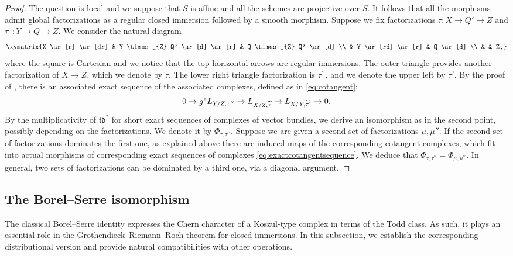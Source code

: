 \documentclass[11pt]{article}
\theoremstyle{plain}
\theoremstyle{definition}
\newcommand{\tdfrak}{\mathfrak {td}}
\begin{document}
\begin{proof}
The question is local and we suppose that $S$ is affine and all the schemes are projective over $S$. It follows that all the morphisms admit global factorizations as a regular closed immersion followed by a smooth morphism. Suppose we fix factorizations $\tau\colon X\to Q'\to Z$ and $\tau^{\prime\prime}\colon Y\to Q\to Z$. We consider the natural diagram
\begin{displaymath}
\xymatrix{X \ar[r] \ar[dr] & Y \times_{Z} Q' \ar[d] \ar[r] & Q \times_{Z} Q' \ar[d] \\
& Y \ar[rd] \ar[r] & Q \ar[d] \\
& & Z,}
\end{displaymath}
where the square is Cartesian and we notice that the top horizontal arrows are regular immersions. The outer triangle provides another factorization of $X\to Z$, which we denote by $\widetilde{\tau}$. The lower right triangle factorization is $\tau^{\prime \prime}$, and we denote the upper left by $\widetilde{\tau}'$. By the proof of \cite[Exp.\,VIII, Prop.\,2.6]{SGA6}, there is an associated exact sequence of the associated complexes, defined as in \eqref{eq:cotangent}:
\begin{equation}\label{eq:exactcotangentsequence}
0 \to g^{\ast} L_{Y/Z, \tau^{\prime \prime}} \to L_{X/Z, \widetilde{\tau}}\to L_{\substack{\vspace{-0.08cm}\\ X/Y, \widetilde{\tau}^{\prime}}}\to 0.
\end{equation}
By the multiplicativity of $\tdfrak^{\ast}$ for short exact sequences of complexes of vector bundles, we derive an isomorphism as in the second point, possibly depending on the factorizations. We denote it by $\Phi_{\tau,\tau^{\prime\prime}}$.
Suppose we are given a second set of factorizations $\mu, \mu''$. If the second set of factorizations dominates the first one, as explained above there are induced maps of the corresponding cotangent complexes, which fit into actual morphisms of corresponding exact sequences of complexes \eqref{eq:exactcotangentsequence}. We deduce that $\Phi_{\tau,\tau^{\prime\prime}}=\Phi_{\mu,\mu^{\prime \prime}}$. In general, two sets of factorizations can be dominated by a third one, via a diagonal argument.
\end{proof}

\subsection{The Borel--Serre isomorphism}\label{subsec:Borel-Serre}
\mbox{}\hspace*{-2mm}
The classical Borel--Serre identity \hbox{\cite[Lem.\,18]{Borel-Serre}} expresses the Chern character of a Koszul-type complex in terms of the Todd class. As such, it plays an essential role in the Grothendieck--Riemann--Roch theorem for closed immersions. In this subsection, we establish the corresponding distributional version and provide natural compatibilities with other operations.
\end{document}
